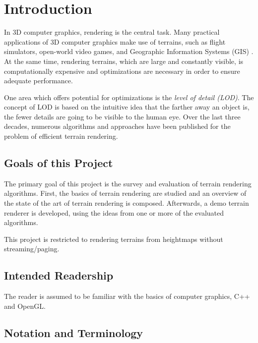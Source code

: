 \chapter{Introduction}
In 3D computer graphics, rendering is the central task.
Many practical applications of 3D computer graphics make use of terrains, 
such as flight simulators, open-world video games, and Geographic Information Systems (GIS) \cite[p.~185]{lodfor3dgraphics}.
At the same time, rendering terrains, which are large and constantly visible, is computationally expensive 
and optimizations are necessary in order to ensure adequate performance.

One area which offers potential for optimizations is the \textit{level of detail (LOD)}.
The concept of LOD is based on the intuitive idea that the farther away an object is, the fewer details are going to be visible to the human eye.
Over the last three decades, numerous algorithms and approaches have been published 
for the problem of efficient terrain rendering.

\section{Goals of this Project}
The primary goal of this project is the survey and evaluation
of terrain rendering algorithms.
First, the basics of terrain rendering are studied and 
an overview of the state of the art of terrain rendering is 
composed. Afterwards, a demo terrain renderer is developed,
using the ideas from one or more of the evaluated algorithms.

This project is restricted to rendering terrains from heightmaps without streaming/paging.

\section{Intended Readership}
The reader is assumed to be familiar with the basics of computer graphics, C++ and OpenGL.

\section{Notation and Terminology}
